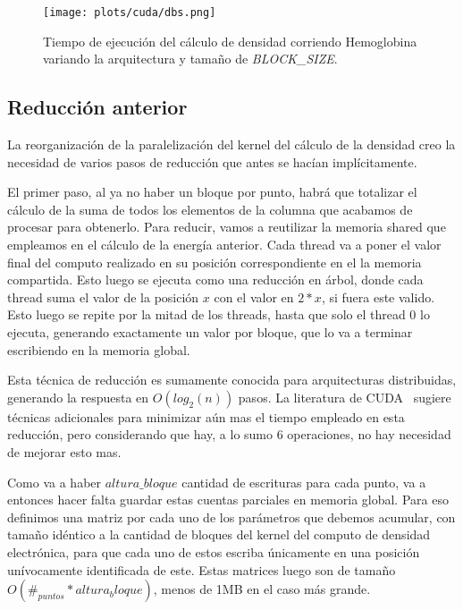 \begin{figure}[htbp]
   \centering
   \texttt{[image: plots/cuda/dbs.png]}
   \caption{Tiempo de ejecuci\'on del c\'alculo de densidad corriendo Hemoglobina variando
   la arquitectura y tama\~no de \textit{BLOCK\_SIZE}.}
   \label{fig:dbs-runtime}
\end{figure}


\subsection{Reducci\'on anterior}
La reorganizaci\'on de la paralelizaci\'on del kernel del c\'alculo de la densidad creo la necesidad
de varios pasos de reducci\'on que antes se hac\'ian impl\'icitamente.

El primer paso, al ya no haber un bloque por punto, habr\'a que totalizar el c\'alculo de la
suma de todos los elementos de la columna que acabamos de procesar para obtenerlo. Para reducir,
vamos a reutilizar la memoria shared que empleamos en el c\'alculo de la energ\'ia anterior. Cada
thread va a poner el valor final del computo realizado en su posici\'on correspondiente en el
la memoria compartida. Esto luego se ejecuta como una reducci\'on en \'arbol, donde cada
thread suma el valor de la posici\'on $x$ con el valor en $2*x$, si fuera este valido. Esto
luego se repite por la mitad de los threads, hasta que solo el thread 0 lo ejecuta,
generando exactamente un valor por bloque, que lo va a terminar escribiendo en la memoria
global.

Esta t\'ecnica de reducci\'on es sumamente conocida para arquitecturas distribuidas, generando
la respuesta en $O(log_2(n))$ pasos. La literatura de CUDA~\cite{cudaReductions} sugiere t\'ecnicas adicionales para
minimizar a\'un mas el tiempo empleado en esta reducci\'on, pero considerando que hay, a lo sumo
6 operaciones, no hay necesidad de mejorar esto mas.

Como va a haber $altura\_bloque$ cantidad de escrituras para cada punto, va a entonces
hacer falta guardar estas cuentas parciales en memoria global. Para eso definimos una matriz
por cada uno de los par\'ametros que debemos acumular, con tama\~no id\'entico a la cantidad de bloques
del kernel del computo de densidad electr\'onica, para que cada uno de estos escriba \'unicamente en una posici\'on
un\'ivocamente identificada de este. Estas matrices luego son de tama\~no $O(\#_{puntos} * altura_bloque)$,
menos de 1MB en el caso m\'as grande.

